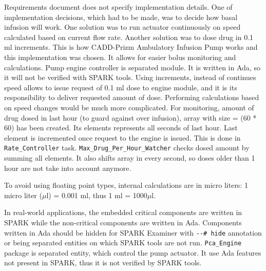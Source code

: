 Requirements document does not specify implementation details. One of implementation decisions, which had to be made, was to decide how basal infusion will work. One solution was to run actuator continuously on speed calculated based on current flow rate. Another solution was to dose drug in 0.1 ml increments. This is how CADD-Prizm Ambulatory Infusion Pump \cite{CADD-PrizmAmbulatoryInfusionPump:Online} works and this implementation was chosen. It allows for easier bolus monitoring and calculations. Pump engine controller is separated module. It is written in Ada, so it will not be verified with SPARK tools. Using increments, instead of continues speed allows to issue request of 0.1 ml dose to engine module, and it is its responsibility to deliver requested amount of dose. Performing calculations based on speed changes would be much more complicated. For monitoring, amount of drug dosed in last hour (to guard against over infusion), array with size = (60 * 60) has been created. Its elements represents all seconds of last hour. Last element is incremented once request to the engine is issued. This is done in \lstinline{Rate_Controller} task. \lstinline{Max_Drug_Per_Hour_Watcher} checks dosed amount by summing all elements. It also shifts array in every second, so doses older than 1 hour are not take into account anymore.

To avoid using floating point types, internal calculations are in micro liters: 1 micro liter ($\mu$l) = 0.001 ml, thus 1 ml = 1000$\mu$l.

In real-world applications, the embedded critical components are written in SPARK while the non-critical components are written in Ada. Components written in Ada should be hidden for SPARK Examiner with \lstinline{--# hide} annotation or being separated entities on which SPARK tools are not run. \lstinline{Pca_Engine} package is separated entity, which control the pump actuator. It use Ada features not present in SPARK, thus it is not verified by SPARK tools. 

